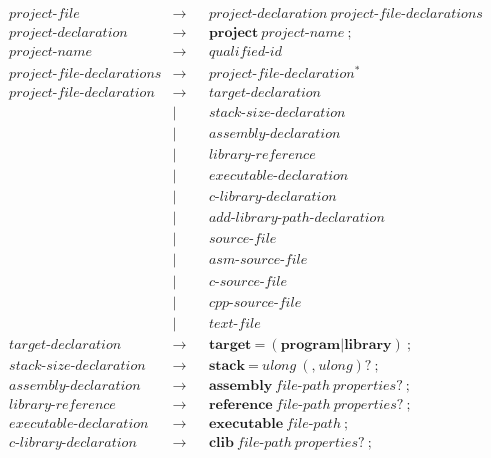 \documentclass[a4paper,oneside,11pt]{article}
\begin{document}
\begin{align*}
project\textrm{-}file &\rightarrow & &project\textrm{-}declaration \> project\textrm{-}file\textrm{-}declarations\\
project\textrm{-}declaration &\rightarrow & &\textbf{project} \> project\textrm{-}name \> \texttt{;}\\
project\textrm{-}name &\rightarrow & &\hyperref[qualifiedid]{qualified\textrm{-}id}\\
project\textrm{-}file\textrm{-}declarations &\rightarrow & &project\textrm{-}file\textrm{-}declaration^*\\
project\textrm{-}file\textrm{-}declaration &\rightarrow & &target\textrm{-}declaration\\
&| & &stack\textrm{-}size\textrm{-}declaration\\
&| & &assembly\textrm{-}declaration\\
&| & &library\textrm{-}reference\\
&| & &executable\textrm{-}declaration\\
&| & &c\textrm{-}library\textrm{-}declaration\\
&| & &add\textrm{-}library\textrm{-}path\textrm{-}declaration\\
&| & &source\textrm{-}file\\
&| & &asm\textrm{-}source\textrm{-}file\\
&| & &c\textrm{-}source\textrm{-}file\\
&| & &cpp\textrm{-}source\textrm{-}file\\
&| & &text\textrm{-}file\\
target\textrm{-}declaration &\rightarrow & &\textbf{target} \> \texttt{=} \> (\textbf{program} | \textbf{library}) \> \texttt{;}\\
stack\textrm{-}size\textrm{-}declaration &\rightarrow & &\textbf{stack} \> \texttt{=} \> ulong \> (\texttt{,} \> ulong)? \> \texttt{;}\\
assembly\textrm{-}declaration &\rightarrow & &\textbf{assembly} \> file\textrm{-}path \> properties? \> \texttt{;}\\
library\textrm{-}reference &\rightarrow & &\textbf{reference} \> file\textrm{-}path \> properties? \> \texttt{;}\\
executable\textrm{-}declaration &\rightarrow & &\textbf{executable} \> file\textrm{-}path \> \texttt{;}\\
c\textrm{-}library\textrm{-}declaration &\rightarrow & &\textbf{clib} \> file\textrm{-}path \> properties? \> \texttt{;}\\

\end{align*}
\end{document}
